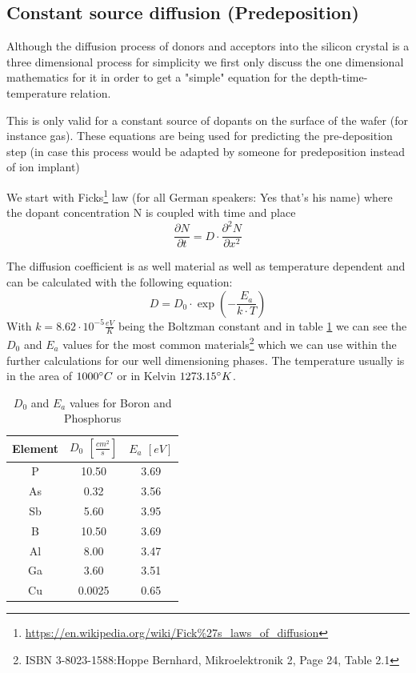 \subsection{Constant source diffusion (Predeposition)}

Although the diffusion process of donors and acceptors into the silicon crystal is a three dimensional process for simplicity we first only discuss the one dimensional mathematics for it in order to get a "simple" equation for the depth-time-temperature relation.

\begin{mdframed}[linewidth=2pt,linecolor=red]
This is only valid for a constant source of dopants on the surface of the wafer (for instance gas).
These equations are being used for predicting the pre-deposition step (in case this process would be adapted by someone for predeposition instead of ion implant)
\end{mdframed}

We start with Ficks\footnote{\url{https://en.wikipedia.org/wiki/Fick\%27s_laws_of_diffusion}} law (for all German speakers: Yes that's his name) where the dopant concentration N is coupled with time and place
\begin{equation}
\frac{\partial N}{\partial t} = D \cdot \frac{\partial^2 N}{\partial x^2}
\end{equation}

The diffusion coefficient is as well material as well as temperature dependent  and can be calculated with the following equation:
\begin{equation}
D = D_0 \cdot \exp\left(-\frac{E_a}{k \cdot T}\right)
\end{equation}
With $k=8.62 \cdot 10^{-5} \frac{eV}{K}$ being the Boltzman constant and in table \ref{table:absolute_diffusion_coefficients} we can see the $D_0$ and $E_a$ values for the most common materials\footnote{ISBN 3-8023-1588:Hoppe Bernhard, Mikroelektronik 2, Page 24, Table 2.1} which we can use within the further calculations for our well dimensioning phases. The temperature usually is in the area of $1000\degree C$ or in Kelvin $1273.15\degree K$.
\begin{table}[H]
	\label{table:absolute_diffusion_coefficients}
	\centering
	\begin{tabular}{|c|c|c|}
		\hline
		Element &
		$D_0$ $\left[\frac{cm^2}{s}\right]$ &
		$E_a$ $\left[eV\right]$ \\
		\hline
		P &
		10.50 &
		3.69 \\
		\hline
		As &
		0.32 &
		3.56 \\
		\hline
		Sb &
		5.60 &
		3.95 \\
		\hline
		B &
		10.50 &
		3.69 \\
		\hline
		Al &
		8.00 &
		3.47 \\
		\hline
		Ga &
		3.60 &
		3.51 \\
		\hline
		Cu &
		0.0025 &
		0.65 \\
		\hline
	\end{tabular}
	\caption{$D_0$ and $E_a$ values for Boron and Phosphorus}
\end{table}

